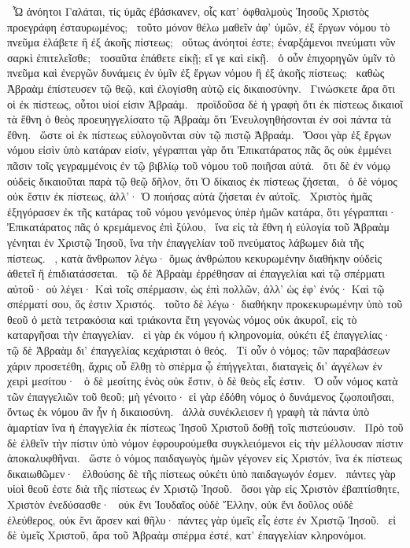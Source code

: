 ~Ὦ ἀνόητοι Γαλάται, τίς ὑμᾶς ἐβάσκανεν, οἷς κατ’ ὀφθαλμοὺς Ἰησοῦς Χριστὸς προεγράφη ἐσταυρωμένος;
~τοῦτο μόνον θέλω μαθεῖν ἀφ’ ὑμῶν, ἐξ ἔργων νόμου τὸ πνεῦμα ἐλάβετε ἢ ἐξ ἀκοῆς πίστεως;
~οὕτως ἀνόητοί ἐστε; ἐναρξάμενοι πνεύματι νῦν σαρκὶ ἐπιτελεῖσθε;
~τοσαῦτα ἐπάθετε εἰκῇ; εἴ γε καὶ εἰκῇ.
~ὁ οὖν ἐπιχορηγῶν ὑμῖν τὸ πνεῦμα καὶ ἐνεργῶν δυνάμεις ἐν ὑμῖν ἐξ ἔργων νόμου ἢ ἐξ ἀκοῆς πίστεως;
~καθὼς Ἀβραὰμ ἐπίστευσεν τῷ θεῷ, καὶ ἐλογίσθη αὐτῷ εἰς δικαιοσύνην.
~Γινώσκετε ἄρα ὅτι οἱ ἐκ πίστεως, οὗτοι υἱοί εἰσιν Ἀβραάμ.
~προϊδοῦσα δὲ ἡ γραφὴ ὅτι ἐκ πίστεως δικαιοῖ τὰ ἔθνη ὁ θεὸς προευηγγελίσατο τῷ Ἀβραὰμ ὅτι Ἐνευλογηθήσονται ἐν σοὶ πάντα τὰ ἔθνη.
~ὥστε οἱ ἐκ πίστεως εὐλογοῦνται σὺν τῷ πιστῷ Ἀβραάμ.
~Ὅσοι γὰρ ἐξ ἔργων νόμου εἰσὶν ὑπὸ κατάραν εἰσίν, γέγραπται γὰρ ὅτι Ἐπικατάρατος πᾶς ὃς οὐκ ἐμμένει πᾶσιν τοῖς γεγραμμένοις ἐν τῷ βιβλίῳ τοῦ νόμου τοῦ ποιῆσαι αὐτά.
~ὅτι δὲ ἐν νόμῳ οὐδεὶς δικαιοῦται παρὰ τῷ θεῷ δῆλον, ὅτι Ὁ δίκαιος ἐκ πίστεως ζήσεται,
~ὁ δὲ νόμος οὐκ ἔστιν ἐκ πίστεως, ἀλλ’· Ὁ ποιήσας αὐτὰ ζήσεται ἐν αὐτοῖς.
~Χριστὸς ἡμᾶς ἐξηγόρασεν ἐκ τῆς κατάρας τοῦ νόμου γενόμενος ὑπὲρ ἡμῶν κατάρα, ὅτι γέγραπται· Ἐπικατάρατος πᾶς ὁ κρεμάμενος ἐπὶ ξύλου,
~ἵνα εἰς τὰ ἔθνη ἡ εὐλογία τοῦ Ἀβραὰμ γένηται ἐν Χριστῷ Ἰησοῦ, ἵνα τὴν ἐπαγγελίαν τοῦ πνεύματος λάβωμεν διὰ τῆς πίστεως.
~, κατὰ ἄνθρωπον λέγω· ὅμως ἀνθρώπου κεκυρωμένην διαθήκην οὐδεὶς ἀθετεῖ ἢ ἐπιδιατάσσεται.
~τῷ δὲ Ἀβραὰμ ἐρρέθησαν αἱ ἐπαγγελίαι καὶ τῷ σπέρματι αὐτοῦ· οὐ λέγει· Καὶ τοῖς σπέρμασιν, ὡς ἐπὶ πολλῶν, ἀλλ’ ὡς ἐφ’ ἑνός· Καὶ τῷ σπέρματί σου, ὅς ἐστιν Χριστός.
~τοῦτο δὲ λέγω· διαθήκην προκεκυρωμένην ὑπὸ τοῦ θεοῦ ὁ μετὰ τετρακόσια καὶ τριάκοντα ἔτη γεγονὼς νόμος οὐκ ἀκυροῖ, εἰς τὸ καταργῆσαι τὴν ἐπαγγελίαν.
~εἰ γὰρ ἐκ νόμου ἡ κληρονομία, οὐκέτι ἐξ ἐπαγγελίας· τῷ δὲ Ἀβραὰμ δι’ ἐπαγγελίας κεχάρισται ὁ θεός.
~Τί οὖν ὁ νόμος; τῶν παραβάσεων χάριν προσετέθη, ἄχρις οὗ ἔλθῃ τὸ σπέρμα ᾧ ἐπήγγελται, διαταγεὶς δι’ ἀγγέλων ἐν χειρὶ μεσίτου·
~ὁ δὲ μεσίτης ἑνὸς οὐκ ἔστιν, ὁ δὲ θεὸς εἷς ἐστιν.
~Ὁ οὖν νόμος κατὰ τῶν ἐπαγγελιῶν τοῦ θεοῦ; μὴ γένοιτο· εἰ γὰρ ἐδόθη νόμος ὁ δυνάμενος ζῳοποιῆσαι, ὄντως ἐκ νόμου ἂν ἦν ἡ δικαιοσύνη.
~ἀλλὰ συνέκλεισεν ἡ γραφὴ τὰ πάντα ὑπὸ ἁμαρτίαν ἵνα ἡ ἐπαγγελία ἐκ πίστεως Ἰησοῦ Χριστοῦ δοθῇ τοῖς πιστεύουσιν.
~Πρὸ τοῦ δὲ ἐλθεῖν τὴν πίστιν ὑπὸ νόμον ἐφρουρούμεθα συγκλειόμενοι εἰς τὴν μέλλουσαν πίστιν ἀποκαλυφθῆναι.
~ὥστε ὁ νόμος παιδαγωγὸς ἡμῶν γέγονεν εἰς Χριστόν, ἵνα ἐκ πίστεως δικαιωθῶμεν·
~ἐλθούσης δὲ τῆς πίστεως οὐκέτι ὑπὸ παιδαγωγόν ἐσμεν.
~πάντες γὰρ υἱοὶ θεοῦ ἐστε διὰ τῆς πίστεως ἐν Χριστῷ Ἰησοῦ.
~ὅσοι γὰρ εἰς Χριστὸν ἐβαπτίσθητε, Χριστὸν ἐνεδύσασθε·
~οὐκ ἔνι Ἰουδαῖος οὐδὲ Ἕλλην, οὐκ ἔνι δοῦλος οὐδὲ ἐλεύθερος, οὐκ ἔνι ἄρσεν καὶ θῆλυ· πάντες γὰρ ὑμεῖς εἷς ἐστε ἐν Χριστῷ Ἰησοῦ.
~εἰ δὲ ὑμεῖς Χριστοῦ, ἄρα τοῦ Ἀβραὰμ σπέρμα ἐστέ, κατ’ ἐπαγγελίαν κληρονόμοι.

